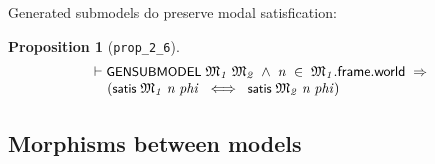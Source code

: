 \documentclass[letterpaper]{article}
\newtheorem{prop}{Proposition}
\renewcommand{\HOLConst}[1]{{\textsf{\upshape\small #1}}}
\newenvironment{holmath}{\begin{displaymath}\begin{array}{l}}{\end{array}\end{displaymath}\ignorespacesafterend}
\begin{document}
Generated submodels do preserve modal satisfication:
\begin{prop}[\texttt{prop_2_6}]
\begin{holmath}
  \ensuremath{\HOLTokenTurnstile}\HOLConst{GENSUBMODEL}\;\HOLFreeVar{\ensuremath{\mathfrak{M}\sb{1}}}\;\HOLFreeVar{\ensuremath{\mathfrak{M}\sb{2}}}\;\HOLSymConst{\HOLTokenConj{}}\;\HOLFreeVar{n}\;\HOLSymConst{\HOLTokenIn{}}\;\HOLFreeVar{\ensuremath{\mathfrak{M}\sb{1}}}.\HOLFieldName{frame}.\HOLFieldName{world}\;\HOLSymConst{\HOLTokenImp{}}\\
\;\;\;\;\;(\HOLConst{satis}\;\HOLFreeVar{\ensuremath{\mathfrak{M}\sb{1}}}\;\HOLFreeVar{n}\;\HOLFreeVar{phi}\;\HOLSymConst{\HOLTokenEquiv{}}\;\HOLConst{satis}\;\HOLFreeVar{\ensuremath{\mathfrak{M}\sb{2}}}\;\HOLFreeVar{n}\;\HOLFreeVar{phi})
\end{holmath}
\end{prop}


\subsection{Morphisms between models}
\end{document}
